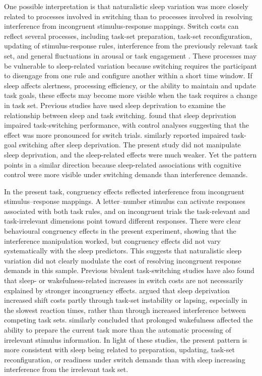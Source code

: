 \documentclass[12pt,a4paper]{report}
\begin{document}
One possible interpretation is that naturalistic sleep variation was more closely related to processes involved in switching than to processes involved in resolving interference from incongruent stimulus-response mappings. Switch costs can reflect several processes, including task-set preparation, task-set reconfiguration, updating of stimulus-response rules, interference from the previously relevant task set, and general fluctuations in arousal or task engagement \parencite{rogers1995taskswitch,monsell2003switching,kiesel2010review}. These processes may be vulnerable to sleep-related variation because switching requires the participant to disengage from one rule and configure another within a short time window. If sleep affects alertness, processing efficiency, or the ability to maintain and update task goals, these effects may become more visible when the task requires a change in task set. Previous studies have used sleep deprivation to examine the relationship between sleep and task switching. \textcite{couyoumdjian2010switchingsleep} found that sleep deprivation impaired task-switching performance, with control analyses suggesting that the effect was more pronounced for switch trials. \textcite{slama2018sleepswitching} similarly reported impaired task-goal switching after sleep deprivation. The present study did not manipulate sleep deprivation, and the sleep-related effects were much weaker. Yet the pattern points in a similar direction because sleep-related associations with cognitive control were more visible under switching demands than interference demands.

In the present task, congruency effects reflected interference from incongruent stimulus--response mappings. A letter--number stimulus can activate responses associated with both task rules, and on incongruent trials the task-relevant and task-irrelevant dimensions point toward different responses. There were clear behavioural congruency effects in the present experiment, showing that the interference manipulation worked, but congruency effects did not vary systematically with the sleep predictors. This suggests that naturalistic sleep variation did not clearly modulate the cost of resolving incongruent response demands in this sample. Previous bivalent task-switching studies have also found that sleep- or wakefulness-related increases in switch costs are not necessarily explained by stronger incongruency effects. \textcite{heuer2004totalsleepdeprivation} argued that sleep deprivation increased shift costs partly through task-set instability or lapsing, especially in the slowest reaction times, rather than through increased interference between competing task sets. \textcite{bratzke2009constantwakefulness} similarly concluded that prolonged wakefulness affected the ability to prepare the current task more than the automatic processing of irrelevant stimulus information. In light of these studies, the present pattern is more consistent with sleep being related to preparation, updating, task-set reconfiguration, or readiness under switch demands than with sleep increasing interference from the irrelevant task set.
\end{document}
